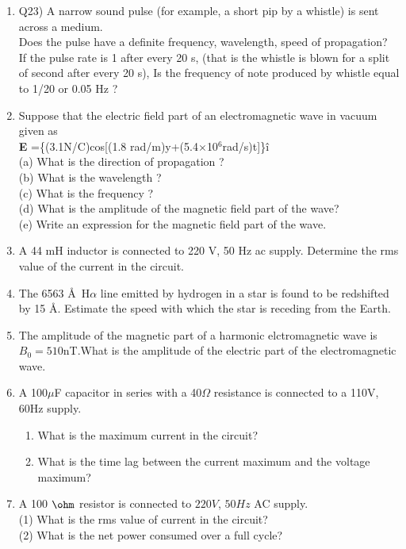 \begin{enumerate}[label=\thesection.\arabic*,ref=\thesection.\theenumi]
\item Q23) A narrow sound pulse (for example, a short pip by a whistle) is sent across a
	medium.\\  Does the pulse have a definite  frequency,  wavelength,  speed
	of propagation?\\[1ex] If the pulse rate is 1 after every 20 s, (that is the whistle is
	blown for a split of second after every 20 s), Is the frequency of note produced
	by whistle equal to 1/20 or 0.05 Hz ?\\
\solution
\pagebreak
\item Suppose that the electric field part of an electromagnetic wave in vacuum given as\\ \textbf{E} =\{(3.1N/C)cos[(1.8 rad/m)y+(5.4$\times$10$^{6}$rad/s)t]\}\^i \\
(a) What is the direction of propagation ?\\
(b) What is the wavelength ? \\
(c) What is the frequency ?\\
(d) What is the amplitude of the magnetic field part of the wave?\\
(e) Write an expression for the magnetic field part of the wave.\\
\solution
\pagebreak

\item A 44 mH inductor is connected to 220 V, 50 Hz ac supply. Determine
the rms value of the current in the circuit.\\
\solution
\pagebreak

\item The 6563 \AA\, H$\alpha$ line emitted by hydrogen in a star is found to be redshifted by 15 \AA. Estimate the speed with which the star is receding from the Earth.
\solution
\pagebreak
\item The amplitude  of the magnetic part of a harmonic elctromagnetic wave is $B_0=510$nT.What is the amplitude of the electric part of the electromagnetic wave.\\
\solution
\pagebreak

\item A 100$\mu$F capacitor in series with a 40$\Omega$ resistance is connected to a 110V, 60Hz supply.
\begin{enumerate}[label = {\brak{\alph*}}]
\item What is the maximum current in the circuit?
\item What is the time lag between the current maximum and the voltage maximum?\\
\end{enumerate}
\solution
\pagebreak
\item A 100 $\ohm$ resistor is connected to $220 V$, $50 Hz$ AC supply.\\
(1) What is the rms value of current in the circuit?\\
(2) What is the net power consumed over a full cycle?


\end{enumerate}
